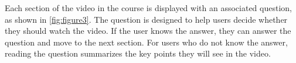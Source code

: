 \documentclass{chi-ext}
\begin{document}
Each section of the video in the course is displayed with an associated question, as shown in 
\autoref{fig:figure3}. The question is designed to help users decide whether they should watch the video. If the user knows the answer, they can answer the question and move to the next section. For users who do not  know the answer, reading the question summarizes the key points they will see in the video.




\end{document}
